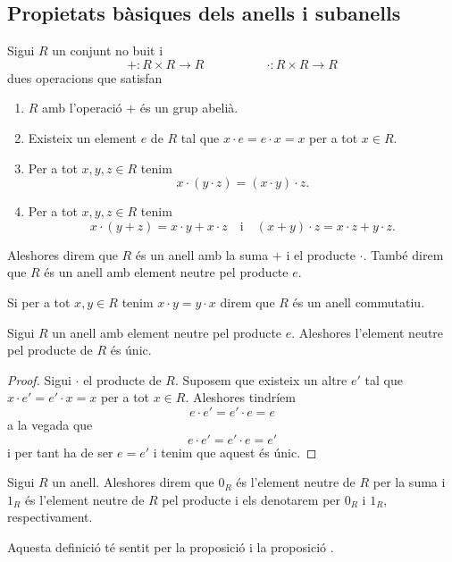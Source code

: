 \documentclass[../Apunts.tex]{subfiles}
\begin{document}
	\subsection{Propietats bàsiques dels anells i subanells}
	\begin{definition}[Anell]
		\label{def:anell}
		\label{def:anell commutatiu}
		\label{def:anell i element neutre pel producte}
		Sigui \(R\) un conjunt no buit i
		\[+\colon R\times R\longrightarrow R\qquad\qquad\quad\cdot\colon R\times R\longrightarrow R\]
		dues operacions que satisfan
		\begin{enumerate}
			\item \(R\) amb l'operació \(+\) és un grup abelià.
			\item Existeix un element \(e\) de \(R\) tal que \(x\cdot e=e\cdot x=x\) per a tot \(x\in R\).
			\item Per a tot \(x,y,z\in R\) tenim
			\[x\cdot(y\cdot z)=(x\cdot y)\cdot z.\]
			\item Per a tot \(x,y,z\in R\) tenim
			\[x\cdot(y+z)=x\cdot y+x\cdot z\quad\text{i}\quad(x+y)\cdot z=x\cdot z+y\cdot z.\]
		\end{enumerate}
		Aleshores direm que \(R\) és un anell amb la suma \(+\) i el producte \(\cdot\). També direm que \(R\) és un anell amb element neutre pel producte \(e\).
		
		Si per a tot \(x,y\in R\) tenim \(x\cdot y=y\cdot x\) direm que \(R\) és un anell commutatiu.
	\end{definition}
	\begin{proposition}
		\label{prop:unicitat neutre del producte anell}
		Sigui \(R\) un anell amb element neutre pel producte \(e\). Aleshores l'element neutre pel producte de \(R\) és únic.
		\begin{proof}
			Sigui \(\cdot\) el producte de \(R\). Suposem que existeix un altre \(e'\) tal que \(x\cdot e'=e'\cdot x=x\) per a tot \(x\in R\). Aleshores tindríem
			\[e\cdot e'=e'\cdot e=e\]
			a la vegada que
			\[e\cdot e'=e'\cdot e=e'\]
			i per tant ha de ser \(e=e'\) i tenim que aquest és únic.
		\end{proof}
	\end{proposition}
	\begin{definition}
		\label{def:l'element neutre d'un anell per la suma}
		\label{def:l'element neutre d'un anell pel producte}
		Sigui \(R\) un anell. Aleshores direm que \(0_{R}\) és l'element neutre de \(R\) per la suma i \(1_{R}\) és l'element neutre de \(R\) pel producte i els denotarem per \(0_{R}\) i \(1_{R}\), respectivament.
		
		Aquesta definició té sentit per la proposició  i la proposició .
	\end{definition}
\end{document}

